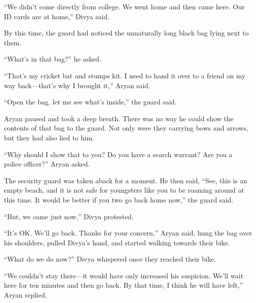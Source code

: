 “We didn't come directly from college. We went home and then came here. Our
ID cards are at home,” Divya said.

By this time, the guard had noticed the unnaturally long black bag lying next to
them.

“What's in that bag?” he asked.

“That's my cricket bat and stumps kit. I need to hand it over to a friend on my
way back—that's why I brought it,” Aryan said.

“Open the bag, let me see what's inside,” the guard said.

Aryan paused and took a deep breath. There was no way he could show the contents
of that bag to the guard. Not only were they carrying bows and arrows, but they had
also lied to him.

“Why should I show that to you? Do you have a search warrant? Are you a police officer?”
Aryan asked.

The security guard was taken aback for a moment. He then said, “See, this is an
empty beach, and it is not safe for youngsters like you to be roaming around at
this time. It would be better if you two go back home now,” the guard
said.

“But, we came just now,” Divya protested.

“It's OK. We'll go back. Thanks for your concern,” Aryan said, hung the bag over
his shoulders, pulled Divya's hand, and started walking towards their bike.

“What do we do now?” Divya whispered once they reached their bike.

“We couldn't stay there—it would have only increased his suspicion. We'll wait
here for ten minutes and then go back. By that time, I think he will have
left,” Aryan replied.